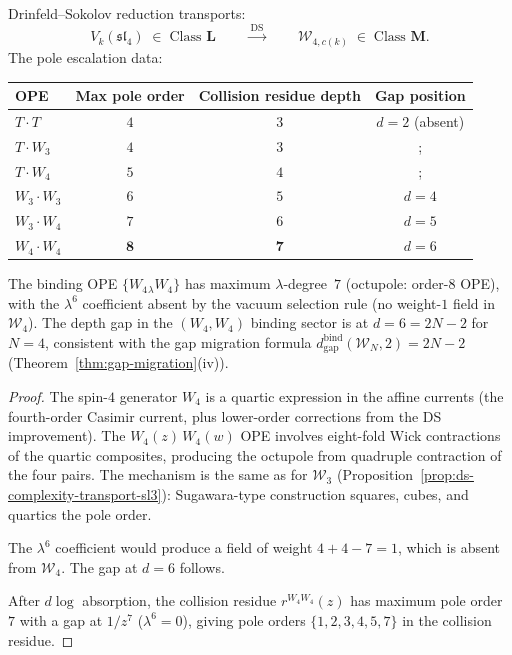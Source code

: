 \begin{proposition}
\label{prop:ds-complexity-transport-sl4}
%
%
Drinfeld--Sokolov reduction transports:
\[
V_k(\mathfrak{sl}_4) \;\in\; \text{Class } \mathbf{L}
\qquad\xrightarrow{\;\mathrm{DS}\;}\qquad
\mathcal{W}_{4,c(k)} \;\in\; \text{Class } \mathbf{M}.
\]
The pole escalation data:
\begin{center}
\small
\renewcommand{\arraystretch}{1.3}
\begin{tabular}{lccc}
\toprule
\textbf{OPE} & \textbf{Max pole order}
 & \textbf{Collision residue depth}
 & \textbf{Gap position} \\
\midrule
$T \cdot T$ & $4$ & $3$ & $d = 2$ \textup{(}absent\textup{)} \\
$T \cdot W_3$ & $4$ & $3$ &; \\
$T \cdot W_4$ & $5$ & $4$ &; \\
$W_3 \cdot W_3$ & $6$ & $5$ & $d = 4$ \\
$W_3 \cdot W_4$ & $7$ & $6$ & $d = 5$ \\
$W_4 \cdot W_4$ & $\mathbf{8}$ & $\mathbf{7}$ & $d = 6$ \\
\bottomrule
\end{tabular}
\end{center}
The binding OPE $\{W_4{}_\lambda W_4\}$ has maximum $\lambda$-degree~$7$
\textup{(}octupole: order-$8$ OPE\textup{)}, with the $\lambda^6$ coefficient
absent by the vacuum selection rule
\textup{(}no weight-$1$ field in $\mathcal{W}_4$\textup{)}.
The depth gap in the $(W_4, W_4)$ binding sector is at
$d = 6 = 2N - 2$ for $N = 4$, consistent with the gap migration
formula
$d_{\mathrm{gap}}^{\mathrm{bind}}(\mathcal{W}_N, 2) = 2N - 2$
\textup{(}Theorem~\textup{\ref{thm:gap-migration}(iv))}.
\end{proposition}

\begin{proof}
The spin-$4$ generator $W_4$ is a quartic expression in the affine
currents (the fourth-order Casimir current, plus lower-order corrections
from the DS improvement). The $W_4(z)\,W_4(w)$ OPE involves
eight-fold Wick contractions of the quartic composites, producing
the octupole from quadruple contraction of the four pairs.
The mechanism is the same as for $\mathcal{W}_3$
(Proposition~\ref{prop:ds-complexity-transport-sl3}): Sugawara-type
construction squares, cubes, and quartics the pole order.

The $\lambda^6$ coefficient would produce a field of weight
$4 + 4 - 7 = 1$, which is absent from $\mathcal{W}_4$.
The gap at $d = 6$ follows.

After $d\log$ absorption, the collision residue
$r^{W_4 W_4}(z)$ has maximum pole order~$7$ with a gap at
$1/z^7$ ($\lambda^6 = 0$), giving pole orders
$\{1, 2, 3, 4, 5, 7\}$ in the collision residue.
\end{proof}

